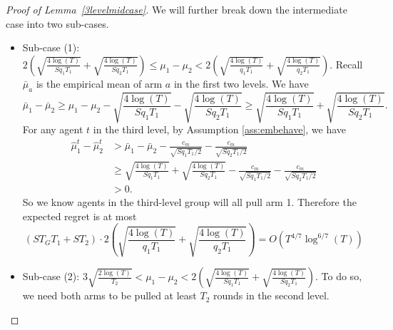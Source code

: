\begin{proof}[Proof of Lemma~\ref{3levelmidcase}]
  We will further break down the intermediate case into two sub-cases.
\begin{itemize}

\item Sub-case (1):
  $2\left(\sqrt{\frac{4\log(T)}{Sq_1T_1}} +
    \sqrt{\frac{4\log(T)}{Sq_2T_1}}\right) \leq \mu_1-\mu_2 <
  2\left(\sqrt{\frac{4\log(T)}{q_1T_1}} +
    \sqrt{\frac{4\log(T)}{q_2T_1}}\right)$. Recall $\bar{\mu}_a$ is
  the empirical mean of arm $a$ in the first two levels. We have
\[
\bar{\mu}_1 - \bar{\mu}_2 \geq \mu_1 -\mu_2 - \sqrt{\frac{4\log(T)}{Sq_1T_1}} - \sqrt{\frac{4\log(T)}{Sq_2T_1}} \geq  \sqrt{\frac{4\log(T)}{Sq_1T_1}} 
+ \sqrt{\frac{4\log(T)}{Sq_2T_1}}.
\]
For any agent $t$ in the third level, by Assumption \ref{ass:embehave}, we have
\begin{align*}
\hat{\mu}_1^t - \hat{\mu}_2^t &>\bar{\mu}_1 - \bar{\mu}_2 - \frac{c_m}{\sqrt{Sq_1T_1/2}} - \frac{c_m}{\sqrt{Sq_2T_1/2}}\\
&\geq  \sqrt{\frac{4\log(T)}{Sq_1T_1}} + \sqrt{\frac{4\log(T)}{Sq_2T_1}}- \frac{c_m}{\sqrt{Sq_1T_1/2}} - \frac{c_m}{\sqrt{Sq_2T_1/2}}\\
 &> 0.
\end{align*}
So we know agents in the third-level group will all pull arm 1. Therefore the expected regret is at most 
\[
(S T_G T_1 + S T_2) \cdot 2\left(\sqrt{\frac{4\log(T)}{q_1T_1}} 
+ \sqrt{\frac{4\log(T)}{q_2T_1}}\right) = O(T^{4/7} \log^{6/7}(T))
\]

\item Sub-case (2):
  $ 3\sqrt{\frac{2\log(T)}{T_2}} < \mu_1-\mu_2 <
  2\left(\sqrt{\frac{4\log(T)}{Sq_1T_1}} +
    \sqrt{\frac{4\log(T)}{Sq_2T_1}}\right)$.  To do so, we need both
  arms to be pulled at least $T_2$ rounds in the second level.


\end{itemize}
\end{proof}
